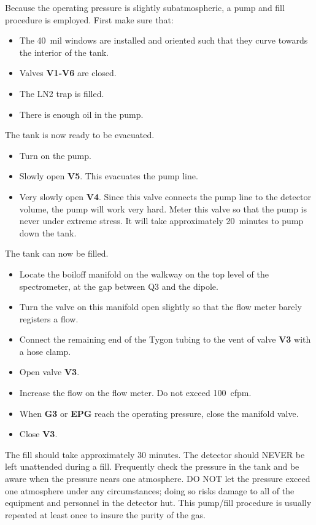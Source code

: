 Because the operating pressure is slightly subatmospheric, a pump and fill
procedure is employed.  First make sure that:
\begin{itemize}
\item The 40~mil windows are installed and oriented such that they curve
towards the interior of the tank.
\item Valves {\bf V1-V6} are closed.
\item The LN2 trap is filled.
\item There is enough oil in the pump.
\end{itemize}
The tank is now ready to be evacuated.
\begin{itemize}
\item Turn on the pump.
\item Slowly open {\bf V5}.  This evacuates the pump line.
\item Very slowly open {\bf V4}.  Since this valve connects the pump line to
the detector volume, the pump will work very hard.  Meter this valve
so that the pump is never under extreme stress.  It will take approximately
20~minutes to pump down the tank.
\end{itemize}
The tank can now be filled.
\begin{itemize}
\item Locate the boiloff manifold on the walkway on the top level of the
spectrometer, at the gap between Q3 and the dipole.
\item Turn the valve on this manifold open slightly so that the flow meter
barely registers a flow.
\item Connect the remaining end of the Tygon tubing to the vent of valve
{\bf V3} with a hose clamp.
\item Open valve {\bf V3}.
\item Increase the flow on the flow meter.  Do not exceed 100~cfpm.
\item When {\bf G3} or {\bf EPG} reach the operating pressure, close
the manifold valve.
\item Close {\bf V3}.
\end{itemize}
The fill should take approximately 30 minutes.  The detector should NEVER
be left unattended during a fill.  Frequently check the pressure in the tank
and be aware when the pressure nears one atmosphere.  DO NOT let the pressure
exceed one atmosphere under any circumstances; doing so risks damage to all of
the equipment and personnel in the detector hut.  This pump/fill procedure is usually 
repeated at least once to insure the
purity of the gas.

